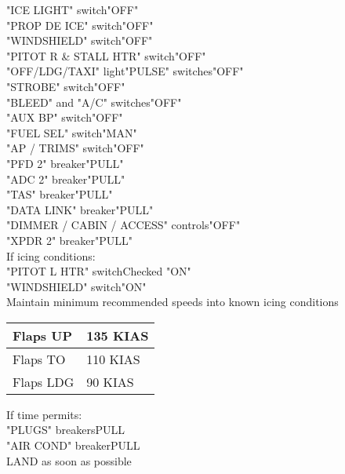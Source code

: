 \documentclass{article}
\begin{document}
\begin{multicols*}{2}
\hspace*{6mm} "ICE LIGHT" switch\dotfill "OFF"\\
\hspace*{6mm} "PROP DE ICE" switch\dotfill "OFF"\\
\hspace*{6mm} "WINDSHIELD" switch\dotfill "OFF"\\
\hspace*{6mm} "PITOT R \& STALL HTR" switch\dotfill "OFF"\\
\hspace*{6mm} "OFF/LDG/TAXI" light"PULSE" switches\dotfill "OFF"\\
\hspace*{6mm} "STROBE" switch\dotfill "OFF"\\
\hspace*{6mm} "BLEED" and "A/C" switches\dotfill "OFF"\\
\hspace*{6mm} "AUX BP" switch\dotfill "OFF"\\
\hspace*{6mm} "FUEL SEL" switch\dotfill "MAN"\\
\hspace*{6mm} "AP / TRIMS" switch\dotfill "OFF"\\
\hspace*{6mm} "PFD 2" breaker\dotfill "PULL"\\
\hspace*{6mm} "ADC 2" breaker\dotfill "PULL"\\
\hspace*{6mm} "TAS" breaker\dotfill "PULL"\\
\hspace*{6mm} "DATA LINK" breaker\dotfill "PULL"\\
\hspace*{6mm} "DIMMER / CABIN / ACCESS" controls\dotfill "OFF"\\
\hspace*{6mm} "XPDR 2" breaker\dotfill "PULL"\\
If icing conditions:\\
\hspace*{6mm} "PITOT L HTR" switch\dotfill Checked "ON"\\
\hspace*{6mm} "WINDSHIELD" switch\dotfill "ON"\\
Maintain minimum recommended speeds into known icing conditions\\
\begin{tabular}{|l|l|}
    \hline
    Flaps UP  & 135 KIAS \\ \hline
    Flaps TO  & 110 KIAS \\ \hline
    Flaps LDG & 90 KIAS  \\ \hline
    \end{tabular}
\break
If time permits:\\
\hspace*{6mm} "PLUGS" breakers\dotfill PULL\\
\hspace*{6mm} "AIR COND" breaker\dotfill PULL\\
LAND as soon as possible

\end{multicols*}
\end{document}
